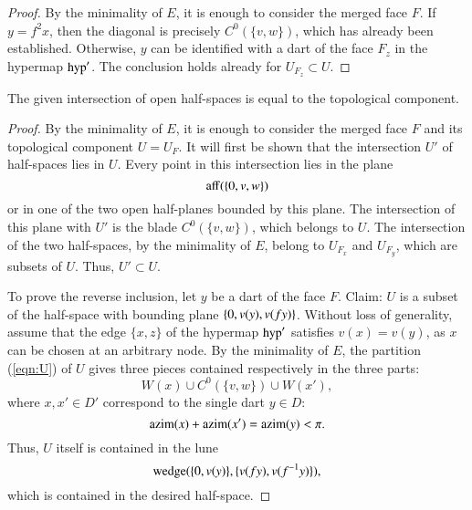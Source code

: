 \begin{proof}
By the minimality of $E$, it is enough to consider the merged face $F$.  
If $y=f^2x$, then the diagonal is precisely $C^0(\{v,w\})$,
which has already been established.  Otherwise, $y$ can be identified with
a dart of the face $F_z$ in the hypermap ${\operatorname{hyp}}'$.  The conclusion holds
already for $U_{F_z}\subset U$.  
\end{proof}


\begin{lemma} The given intersection of open half-spaces is equal
to the topological component. 
\end{lemma}

\begin{proof}
By the minimality of $E$, it is enough to consider
the merged face $F$ and its topological component $U=U_F$.
It will first be shown that the intersection $U'$ of half-spaces lies in $U$.
Every point in this intersection lies in the plane
$$
{\operatorname{aff}}(\{0,v,w\})
$$
or in one of the two open half-planes bounded by this plane.  The intersection
of this plane with $U'$ is the blade $C^0(\{v,w\})$, which belongs
to $U$. The intersection of the two half-spaces, by the minimality of $E$,
belong to $U_{F_x}$ and $U_{F_y}$, which are subsets of $U$.  Thus, $U'\subset U$.

To prove the reverse inclusion, let $y$  be a dart of
the face $F$.  Claim: $U$ is a subset of the half-space with bounding
plane $\{0,v(y),v(f y)\}$.  Without loss of generality, assume that the edge $\{x,z\}$ of the
hypermap ${\operatorname{hyp}}'$ satisfies $v(x) = v(y)$, as $x$ can be chosen at an
arbitrary node.  By the minimality of $E$,  
the partition (\ref{eqn:U}) of $U$ gives three pieces
contained respectively in the three parts:
$$
W(x) \cup C^0(\{v,w\}) \cup W(x'),
$$
where $x,x'\in D'$ correspond to the single dart $y\in D$:
$$
{\operatorname{azim}}(x) + {\operatorname{azim}}(x') = {\operatorname{azim}}(y) < \pi.
$$
Thus, $U$ itself is contained in the lune
$$
{\operatorname{wedge}}(\{0,v(y)\},\{v(f y),v(f^{-1} y)\}),
$$
which is contained in the desired half-space.
\end{proof}

